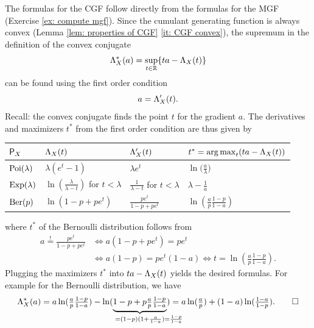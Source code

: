 \documentclass[11pt]{article}
\begin{document}
\begin{solution}
    The formulas for the CGF follow directly from the formulas for the MGF (Exercise \ref{ex: compute mgf}).
    Since the cumulant generating function is always convex (Lemma \ref{lem: properties of CGF} \ref{it: CGF convex}),
    the supremum in the definition of the convex conjugate
    \[
        \Lambda_X^*(a) = \sup_{t \in \mathbb{R}} \{t a - \Lambda_X(t)\}
    \]
    can be found using the first order condition
    \[
        a = \Lambda_X'(t).
    \]
    Recall: the convex conjugate finds the point \(t\) for the gradient \(a\).
    The derivatives and maximizers \(t^*\) from the first order condition are thus given by
    \begin{center}
    \def\arraystretch{1.2}
    \begin{tabular}{l l l l}
        \toprule
        \(\mathsf{P}_X\)
        & \(\Lambda_X(t)\)
        & \(\Lambda_X'(t)\)
        & \(t^*=\operatorname*{arg\,max}_t (ta - \Lambda_X(t))\)
        \\
        \midrule
        \(\mathrm{Poi}(\lambda)\)
        & \(\lambda (e^{t} - 1)\)
        & \(\lambda e^t\)
        & \(\ln\bigl(\frac{a}{\lambda}\bigr)\)
        \\
        \(\mathrm{Exp}(\lambda)\)
        & \(\ln(\frac{\lambda}{\lambda - t})\) for \(t < \lambda\)
        & \(\frac1{\lambda-t}\) for \(t<\lambda\)
        & \(\lambda - \frac1a\)
        \\
        \(\mathrm{Ber}(p)\)
        & \(\ln(1 - p + p e^{t})\)
        & \(\frac{pe^t}{1-p+p e^t}\)
        & \(\ln(\frac{a}p\frac{1-p}{1-a})\)
        \\
        \bottomrule
    \end{tabular}
    \end{center}
    where \(t^*\) of the Bernoulli distribution follows from
    \begin{align*}
        a \overset{!}= \frac{pe^t}{1-p+p e^t}
        &\iff a(1-p+p e^t) = pe^t
        \\
        &\iff a(1-p) = pe^t(1 - a)
        \iff t = \ln(\tfrac{a}p\tfrac{1-p}{1-a}).
    \end{align*}
    Plugging the maximizers \(t^*\) into \(ta - \Lambda_X(t)\) yields the desired formulas.
    For example for the Bernoulli distribution, we have
    \[
        \CGF_X^*(a) = a \ln(\tfrac{a}p\tfrac{1-p}{1-a}) - \ln(\underbrace{1 - p + p \tfrac{a}p\tfrac{1-p}{1-a}}_{= (1-p)(1+\frac{a}{1-a})\mathrlap{=\frac{1-p}{1-a}}})
        = a\ln(\tfrac{a}p) + (1-a)\ln(\tfrac{1-a}{1-p}).
        \qedhere
    \]
\end{solution}


% 
% 
\end{document}
